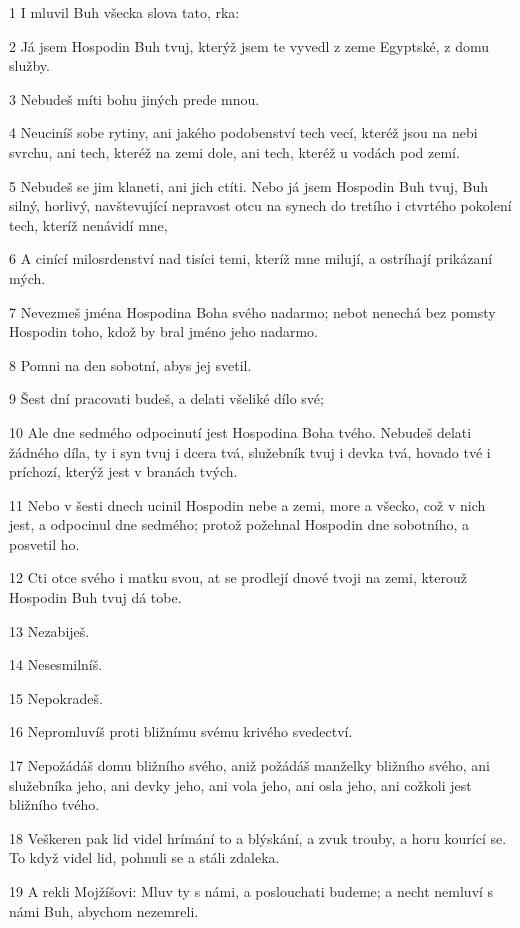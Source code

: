 \par 1 I mluvil Buh všecka slova tato, rka:
\par 2 Já jsem Hospodin Buh tvuj, kterýž jsem te vyvedl z zeme Egyptské, z domu služby.
\par 3 Nebudeš míti bohu jiných prede mnou.
\par 4 Neuciníš sobe rytiny, ani jakého podobenství tech vecí, kteréž jsou na nebi svrchu, ani tech, kteréž na zemi dole, ani tech, kteréž u vodách pod zemí.
\par 5 Nebudeš se jim klaneti, ani jich ctíti. Nebo já jsem Hospodin Buh tvuj, Buh silný, horlivý, navštevující nepravost otcu na synech do tretího i ctvrtého pokolení tech, kteríž nenávidí mne,
\par 6 A cinící milosrdenství nad tisíci temi, kteríž mne milují, a ostríhají prikázaní mých.
\par 7 Nevezmeš jména Hospodina Boha svého nadarmo; nebot nenechá bez pomsty Hospodin toho, kdož by bral jméno jeho nadarmo.
\par 8 Pomni na den sobotní, abys jej svetil.
\par 9 Šest dní pracovati budeš, a delati všeliké dílo své;
\par 10 Ale dne sedmého odpocinutí jest Hospodina Boha tvého. Nebudeš delati žádného díla, ty i syn tvuj i dcera tvá, služebník tvuj i devka tvá, hovado tvé i príchozí, kterýž jest v branách tvých.
\par 11 Nebo v šesti dnech ucinil Hospodin nebe a zemi, more a všecko, což v nich jest, a odpocinul dne sedmého; protož požehnal Hospodin dne sobotního, a posvetil ho.
\par 12 Cti otce svého i matku svou, at se prodlejí dnové tvoji na zemi, kterouž Hospodin Buh tvuj dá tobe.
\par 13 Nezabiješ.
\par 14 Nesesmilníš.
\par 15 Nepokradeš.
\par 16 Nepromluvíš proti bližnímu svému krivého svedectví.
\par 17 Nepožádáš domu bližního svého, aniž požádáš manželky bližního svého, ani služebníka jeho, ani devky jeho, ani vola jeho, ani osla jeho, ani cožkoli jest bližního tvého.
\par 18 Veškeren pak lid videl hrímání to a blýskání, a zvuk trouby, a horu kourící se. To když videl lid, pohnuli se a stáli zdaleka.
\par 19 A rekli Mojžíšovi: Mluv ty s námi, a poslouchati budeme; a necht nemluví s námi Buh, abychom nezemreli.
